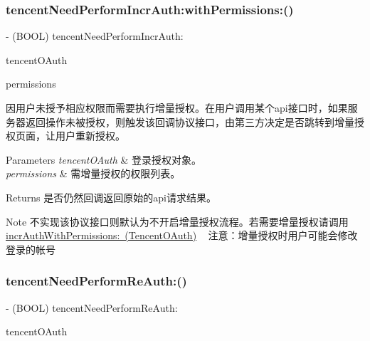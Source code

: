 \subsubsection{\texorpdfstring{tencent\+Need\+Perform\+Incr\+Auth\+:with\+Permissions\+:()}{tencentNeedPerformIncrAuth:withPermissions:()}\hspace{0.1cm}{\footnotesize\ttfamily [2/2]}}
{\footnotesize\ttfamily -\/ (B\+O\+OL) tencent\+Need\+Perform\+Incr\+Auth\+: \begin{DoxyParamCaption}\item[{(\mbox{\hyperlink{interface_tencent_o_auth}{Tencent\+O\+Auth}} $\ast$)}]{tencent\+O\+Auth }\item[{withPermissions:(N\+S\+Array $\ast$)}]{permissions }\end{DoxyParamCaption}\hspace{0.3cm}{\ttfamily [optional]}}

因用户未授予相应权限而需要执行增量授权。在用户调用某个api接口时，如果服务器返回操作未被授权，则触发该回调协议接口，由第三方决定是否跳转到增量授权页面，让用户重新授权。 
\begin{DoxyParams}{Parameters}
{\em tencent\+O\+Auth} & 登录授权对象。 \\
\hline
{\em permissions} & 需增量授权的权限列表。 \\
\hline
\end{DoxyParams}
\begin{DoxyReturn}{Returns}
是否仍然回调返回原始的api请求结果。 
\end{DoxyReturn}
\begin{DoxyNote}{Note}
不实现该协议接口则默认为不开启增量授权流程。若需要增量授权请调用\mbox{\hyperlink{interface_tencent_o_auth_abe9ca35d1c305cc9219cb6738606df2d}{incr\+Auth\+With\+Permissions\+: (Tencent\+O\+Auth)}} ~\newline
注意：增量授权时用户可能会修改登录的帐号 
\end{DoxyNote}
\mbox{\label{protocol_tencent_session_delegate-p_af961aa9926514b095a51a3dfa8514a38}} 
\subsubsection{\texorpdfstring{tencent\+Need\+Perform\+Re\+Auth\+:()}{tencentNeedPerformReAuth:()}\hspace{0.1cm}{\footnotesize\ttfamily [1/2]}}
{\footnotesize\ttfamily -\/ (B\+O\+OL) tencent\+Need\+Perform\+Re\+Auth\+: \begin{DoxyParamCaption}\item[{(\mbox{\hyperlink{interface_tencent_o_auth}{Tencent\+O\+Auth}} $\ast$)}]{tencent\+O\+Auth }\end{DoxyParamCaption}\hspace{0.3cm}{\ttfamily [optional]}}

